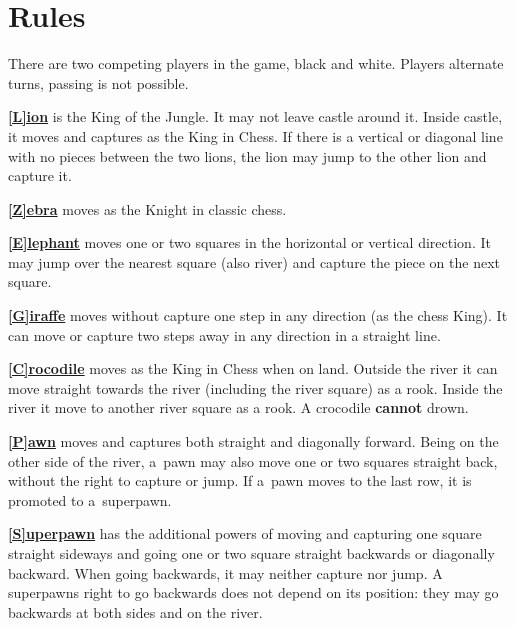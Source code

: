 \section{Rules}

There are two competing players in the game, black and white. Players alternate
turns, passing is not possible.

\vspace{0.5em}

\underline{\textbf{[L]ion}} is the King of the Jungle. It may not leave castle
around it. Inside castle, it moves and captures as the King in Chess. If there
is a vertical or diagonal line with no pieces between the two lions, the lion
may jump to the other lion and capture it.

\vspace{0.5em}

\underline{\textbf{[Z]ebra}} moves as the Knight in classic chess.

\vspace{0.5em}

\underline{\textbf{[E]lephant}} moves one or two squares in the horizontal or
vertical direction. It may jump over the nearest square (also river) and
capture the piece on the next square.

\vspace{0.5em}

\underline{\textbf{[G]iraffe}} moves without capture one step in any direction
(as the chess King). It can move or capture two steps away in any direction in
a straight line.

\vspace{0.5em}

\underline{\textbf{[C]rocodile}} moves as the King in Chess when on land.
Outside the river it can move straight towards the river (including the river
square) as a rook. Inside the river it move to another river square as a rook.
A crocodile \textbf{cannot} drown.

\vspace{0.5em}

\underline{\textbf{[P]awn}} moves and captures both straight and diagonally
forward. Being on the other side of the river, a~pawn may also move one or two
squares straight back, without the right to capture or jump. If a~pawn moves
to the last row, it is promoted to a~superpawn.

\vspace{0.5em}

\underline{\textbf{[S]uperpawn}} has the additional powers of moving and
capturing one square straight sideways and going one or two square straight
backwards or diagonally backward. When going backwards, it may neither capture
nor jump. A superpawns right to go backwards does not depend on its position:
they may go backwards at both sides and on the river.

